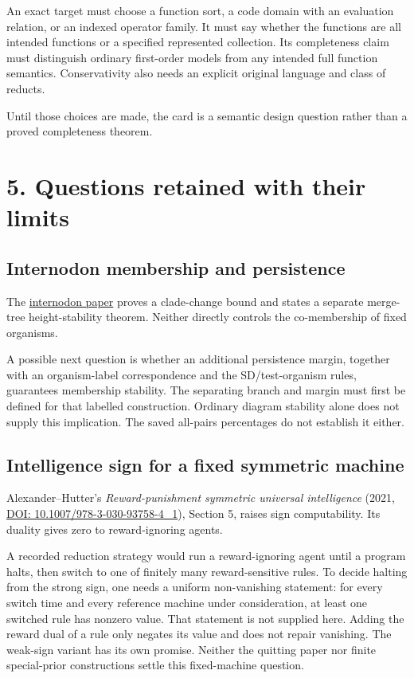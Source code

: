 \documentclass[
  11pt,
  letterpaper,
]{article}
\begin{document}
An exact target must choose a function sort, a code domain with an
evaluation relation, or an indexed operator family. It must say whether
the functions are all intended functions or a specified represented
collection. Its completeness claim must distinguish ordinary first-order
models from any intended full function semantics. Conservativity also
needs an explicit original language and class of reducts.

Until those choices are made, the card is a semantic design question
rather than a proved completeness theorem.

\section{5. Questions retained with their
limits}\label{questions-retained-with-their-limits}

\subsection{Internodon membership and
persistence}\label{internodon-membership-and-persistence}

The
\href{../08-internodon-order-robustness/internodon-order-robustness.pdf}{internodon
paper} proves a clade-change bound and states a separate merge-tree
height-stability theorem. Neither directly controls the co-membership of
fixed organisms.

A possible next question is whether an additional persistence margin,
together with an organism-label correspondence and the SD/test-organism
rules, guarantees membership stability. The separating branch and margin
must first be defined for that labelled construction. Ordinary diagram
stability alone does not supply this implication. The saved all-pairs
percentages do not establish it either.

\subsection{Intelligence sign for a fixed symmetric
machine}\label{intelligence-sign-for-a-fixed-symmetric-machine}

Alexander--Hutter's \emph{Reward-punishment symmetric universal
intelligence} (2021,
\href{https://doi.org/10.1007/978-3-030-93758-4_1}{DOI:
10.1007/978-3-030-93758-4\_1}), Section 5, raises sign computability.
Its duality gives zero to reward-ignoring agents.

A recorded reduction strategy would run a reward-ignoring agent until a
program halts, then switch to one of finitely many reward-sensitive
rules. To decide halting from the strong sign, one needs a uniform
non-vanishing statement: for every switch time and every reference
machine under consideration, at least one switched rule has nonzero
value. That statement is not supplied here. Adding the reward dual of a
rule only negates its value and does not repair vanishing. The weak-sign
variant has its own promise. Neither the quitting paper nor finite
special-prior constructions settle this fixed-machine question.
\end{document}
